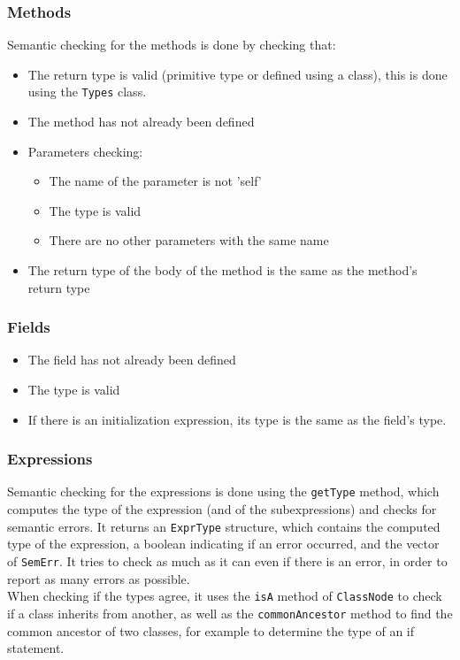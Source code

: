 \documentclass[a4paper,11pt]{article}
\begin{document}
	\subsubsection{Methods}
	Semantic checking for the methods is done by checking that:
	\begin{itemize}
		\item The return type is valid (primitive type or defined using a class), this is done using the \texttt{Types} class.
		\item The method has not already been defined
		\item Parameters checking:
			\begin{itemize}
				\item The name of the parameter is not 'self'
				\item The type is valid
				\item There are no other parameters with the same name
			\end{itemize}
		\item The return type of the body of the method is the same as the method's return type
	\end{itemize}

	\subsubsection{Fields}
	\begin{itemize}
		\item The field has not already been defined
		\item The type is valid
		\item If there is an initialization expression, its type is the same as the field's type.
	\end{itemize}

	\subsubsection{Expressions}
	Semantic checking for the expressions is done using the \texttt{getType} method, which computes the type of the expression (and of the subexpressions) and checks for semantic errors. It returns an \texttt{ExprType} structure, which contains the computed type of the expression, a boolean indicating if an error occurred, and the vector of \texttt{SemErr}. It tries to check as much as it can even if there is an error, in order to report as many errors as possible.\\
	When checking if the types agree, it uses the \texttt{isA} method of \texttt{ClassNode} to check if a class inherits from another, as well as the \texttt{commonAncestor} method to find the common ancestor of two classes, for example to determine the type of an if statement.
\end{document}

